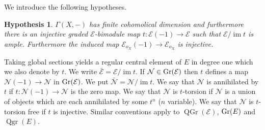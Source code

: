 \documentclass{amsproc}
\def\Escr{{\mathcal E}}
\def\Nscr{{\mathcal N}}
\def\Gr{\mathop{\text{Gr}}}
\def\im{\operatorname {im}}
\def\Qgr{\operatorname {Qgr}}
\def\r{\rightarrow}
\let\oldtext\text
\def\text#1{\oldtext{\upshape #1}}
\DeclareMathOperator{\QGr}{QGr}
\newtheorem{hypothesis}{Hypothesis}
\theoremstyle{definition}
\theoremstyle{remark}
\numberwithin{equation}{section}
\numberwithin{table}{section}
\numberwithin{figure}{section}
\def\Gr{\mathop{\text{Gr}}}
\begin{document}
We introduce the following hypotheses.
{\def\thehypothesis{(***)}
\begin{hypothesis}
  $\Gamma(X,-)$ has finite cohomolical dimension and furthermore there
  is an injective graded $\Escr$-bimodule map $t:\Escr(-1)\r \Escr$
  such that $\Escr/\im t$ is ample. Furthermore the induced map
  $\Escr_{o_X}(-1)\r \Escr_{o_X}$ is injective.
\end{hypothesis}
}
Taking global sections yields a regular central element of $E$ in
degree one which we also denote by $t$.  We write
$\bar{\Escr}=\Escr/\im t$. If $\Nscr\in\Gr (\Escr)$ then $t$ defines a
map $\Nscr(-1)\r \Nscr$ in $\Gr(\Escr)$. We put $\bar{\Nscr}=\Nscr/\im
t$.
We say that $\Nscr$ is annihilated by $t$ if
$t:\Nscr(-1)\r \Nscr$ is the zero map. We say that $\Nscr$ is $t$-torsion
if $\Nscr$ is a union of objects which are each annihilated by some
$t^n$ ($n$ variable). We say that $\Nscr$ is $t$-torsion free if $t$ is
injective. Similar conventions apply to $\QGr(\Escr)$, $\Gr(E)$ and
$\Qgr(E)$.





 
 
\end{document}
